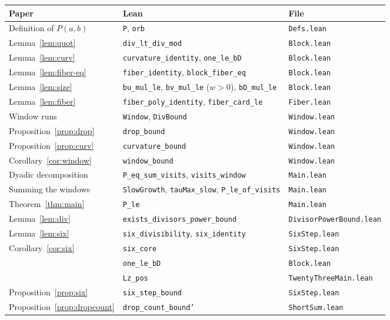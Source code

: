 \documentclass[11pt]{amsart}
\theoremstyle{definition}
\theoremstyle{remark}
\newcommand{\lean}[1]{\texttt{#1}}
\begin{document}
\begin{center}\footnotesize
\begin{tabular}{@{}lll@{}}
\toprule
Paper & Lean & File \\
\midrule
Definition of $P(a,b)$ & \lean{P}, \lean{orb} & \lean{Defs.lean}\\
Lemma~\ref{lem:quot} & \lean{div\_lt\_div\_mod} & \lean{Block.lean}\\
Lemma~\ref{lem:curv} & \lean{curvature\_identity}, \lean{one\_le\_bD} & \lean{Block.lean}\\
Lemma~\ref{lem:fiber-eq} & \lean{fiber\_identity}, \lean{block\_fiber\_eq} & \lean{Block.lean}\\
Lemma~\ref{lem:size} & \lean{bu\_mul\_le}, \lean{bv\_mul\_le} ($w>0$), \lean{bD\_mul\_le} & \lean{Block.lean}\\
Lemma~\ref{lem:fiber} & \lean{fiber\_poly\_identity}, \lean{fiber\_card\_le} & \lean{Fiber.lean}\\
Window runs & \lean{Window}, \lean{DivBound} & \lean{Window.lean}\\
Proposition~\ref{prop:drop} & \lean{drop\_bound} & \lean{Window.lean}\\
Proposition~\ref{prop:curv} & \lean{curvature\_bound} & \lean{Window.lean}\\
Corollary~\ref{cor:window} & \lean{window\_bound} & \lean{Window.lean}\\
Dyadic decomposition & \lean{P\_eq\_sum\_visits}, \lean{visits\_window} & \lean{Main.lean}\\
Summing the windows & \lean{SlowGrowth}, \lean{tauMax\_slow}, \lean{P\_le\_of\_visits} & \lean{Main.lean}\\
Theorem~\ref{thm:main} & \lean{P\_le} & \lean{Main.lean}\\
Lemma~\ref{lem:div} & \lean{exists\_divisors\_power\_bound} & \lean{DivisorPowerBound.lean}\\
Lemma~\ref{lem:six} & \lean{six\_divisibility}, \lean{six\_identity} & \lean{SixStep.lean}\\
Corollary~\ref{cor:six} & \lean{six\_core} & \lean{SixStep.lean}\\
 & \lean{one\_le\_bD} & \lean{Block.lean}\\
 & \lean{Lz\_pos} & \lean{TwentyThreeMain.lean}\\
Proposition~\ref{prop:six} & \lean{six\_step\_bound} & \lean{SixStep.lean}\\
Proposition~\ref{prop:dropcount} & \lean{drop\_count\_bound'} & \lean{ShortSum.lean}\\

\end{tabular}
\end{center}
\end{document}
